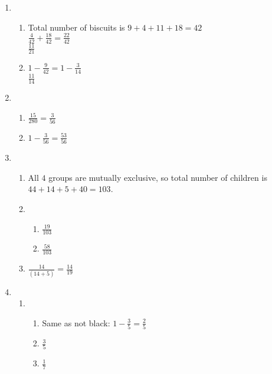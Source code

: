 \begin{eocsolutions}{}
{\begin{enumerate}[itemsep=5pt, label=\textbf{\arabic*}. ]
\begin{enumerate}[noitemsep, label=\textbf{(\alph*)} ]
    \item $1 - \frac{1}{9} = \frac{8}{9}$
    \item $\frac{1}{9} + \frac{4}{9} = \frac{5}{9}$
    \item $1 - \frac{5}{9} = \frac{4}{9}$
    \end{enumerate}
\item %
    \begin{enumerate}[noitemsep, label=\textbf{(\alph*)} ]
    \item Total number of biscuits is $9 + 4 + 11 + 18 = 42$\\
    $\frac{4}{42} + \frac{18}{42} = \frac{22}{42}$\\
    $\frac{11}{21}$
    \item $1 - \frac{9}{42} = 1 - \frac{3}{14}$\\
    $\frac{11}{14}$
    \end{enumerate}
\item %
    \begin{enumerate}[noitemsep, label=\textbf{(\alph*)} ]
    \item $\frac{15}{280} = \frac{3}{56}$
    \item $1 - \frac{3}{56} = \frac{53}{56}$
    \end{enumerate}
\item %
    \begin{enumerate}[noitemsep, label=\textbf{(\alph*)} ]
    \item All $4$ groups are mutually exclusive, so total number of children is $44 + 14 + 5 + 40 = 103$.
    \item
	\begin{enumerate}[itemsep=1pt,  label=\textbf{\roman*}. ]
	\item $\frac{19}{103}$
	\item $\frac{58}{103}$
	\end{enumerate}
    \item $\frac{14}{(14 + 5)} = \frac{14}{19}$
    \end{enumerate}
\item %
    \begin{enumerate}[noitemsep, label=\textbf{(\alph*)} ]
    \item 
	\begin{enumerate}[itemsep=1pt,  label=\textbf{\roman*}. ]
	\item Same as not black: $1 - \frac{3}{5} = \frac{2}{5}$
	\item $\frac{3}{5}$
	\item $\frac{1}{7}$

\end{enumerate}
\end{enumerate}
\end{enumerate}}
\end{eocsolutions}
